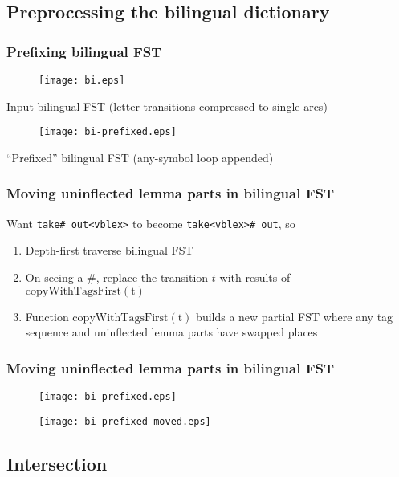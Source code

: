 \documentclass[notes=hide]{beamer}
\newcommand{\ana}[1]{\texttt{#1}}
\newcommand{\fn}[1]{$\mathrm{#1}$}
\begin{document}
\subsection{Preprocessing the bilingual dictionary}
\begin{frame}
  \frametitle{Prefixing bilingual FST}
  \begin{center}
    \begin{figure}[h]
      \texttt{[image: bi.eps]}
    \end{figure}
    \scriptsize{Input bilingual FST (letter transitions compressed to single arcs)}
    \begin{figure}[h]
      \texttt{[image: bi-prefixed.eps]}
    \end{figure}
    \scriptsize{``Prefixed'' bilingual FST (any-symbol loop appended)}
  \end{center}
\end{frame}

\begin{frame}
  \frametitle{Moving uninflected lemma parts in bilingual FST}
  Want \ana{take\# out<vblex>} to become \ana{take<vblex>\# out}, so 
  \begin{enumerate}
  \item Depth-first traverse bilingual FST
  \item On seeing a \#, replace the transition $t$ with results of \fn{copyWithTagsFirst(t)}
  \item Function \fn{copyWithTagsFirst(t)} builds a new partial FST
    where any tag sequence and uninflected lemma parts have swapped
    places
  \end{enumerate}
\end{frame}

\begin{frame}
  \frametitle{Moving uninflected lemma parts in bilingual FST}
  \begin{center}
    \begin{figure}[h]
      \texttt{[image: bi-prefixed.eps]}
    \end{figure}

    \begin{figure}[h]
      \texttt{[image: bi-prefixed-moved.eps]}
    \end{figure}
  \end{center}

\end{frame}


\subsection{Intersection}
\end{document}
